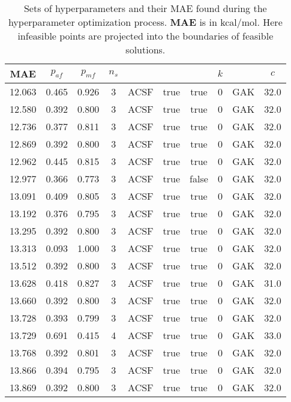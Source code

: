 \documentclass[12pt]{article}
\begin{document}
\begin{table}[H]
	\centering
	\caption{Sets of hyperparameters and their MAE found during the hyperparameter optimization process. \textbf{MAE} is in kcal/mol. Here infeasible points are projected into the boundaries of feasible solutions.} 
	\begin{tabular}{|c|c|c|c|c|c|c|c|c|c|}
		\hline
		\textbf{MAE}	& $p_{af}$ & $p_{mf}$ & $n_s$ & \codeword{ftype} & \codeword{norm_af} & \codeword{norm_mf} & $k$ & \codeword{model} & $c$	\\ \hline
		12.063	& 0.465	& 0.926	& 3	& ACSF	& true	& true	& 0	& GAK	& 32.0	\\ \hline
		12.580	& 0.392	& 0.800	& 3	& ACSF	& true	& true	& 0	& GAK	& 32.0	\\ \hline
		12.736	& 0.377	& 0.811	& 3	& ACSF	& true	& true	& 0	& GAK	& 32.0	\\ \hline
		12.869	& 0.392	& 0.800	& 3	& ACSF	& true	& true	& 0	& GAK	& 32.0	\\ \hline
		12.962	& 0.445	& 0.815	& 3	& ACSF	& true	& true	& 0	& GAK	& 32.0	\\ \hline
		12.977	& 0.366	& 0.773	& 3	& ACSF	& true	& false	& 0	& GAK	& 32.0	\\ \hline
		13.091	& 0.409	& 0.805	& 3	& ACSF	& true	& true	& 0	& GAK	& 32.0	\\ \hline
		13.192	& 0.376	& 0.795	& 3	& ACSF	& true	& true	& 0	& GAK	& 32.0	\\ \hline
		13.295	& 0.392	& 0.800	& 3	& ACSF	& true	& true	& 0	& GAK	& 32.0	\\ \hline
		13.313	& 0.093	& 1.000	& 3	& ACSF	& true	& true	& 0	& GAK	& 32.0	\\ \hline
		13.512	& 0.392	& 0.800	& 3	& ACSF	& true	& true	& 0	& GAK	& 32.0	\\ \hline
		13.628	& 0.418	& 0.827	& 3	& ACSF	& true	& true	& 0	& GAK	& 31.0	\\ \hline
		13.660	& 0.392	& 0.800	& 3	& ACSF	& true	& true	& 0	& GAK	& 32.0	\\ \hline
		13.728	& 0.393	& 0.799	& 3	& ACSF	& true	& true	& 0	& GAK	& 32.0	\\ \hline
		13.729	& 0.691	& 0.415	& 4	& ACSF	& true	& true	& 0	& GAK	& 33.0	\\ \hline
		13.768	& 0.392	& 0.801	& 3	& ACSF	& true	& true	& 0	& GAK	& 32.0	\\ \hline
		13.866	& 0.394	& 0.795	& 3	& ACSF	& true	& true	& 0	& GAK	& 32.0	\\ \hline
		13.869	& 0.392	& 0.800	& 3	& ACSF	& true	& true	& 0	& GAK	& 32.0	\\ \hline

\end{tabular}
\end{table}
\end{document}
